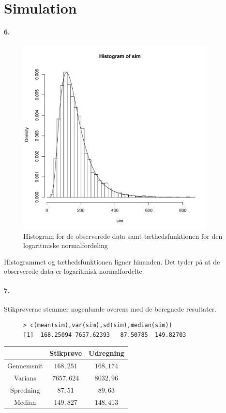 \section{Simulation}
\paragraph{6.}
\begin{figure}[H]
\label{fig:sim1}
\begin{center}
\includegraphics[width=10cm]{graphs/simulation_1.pdf}
\caption{Histogram for de observerede data samt tæthedsfunktionen for
den logaritmiske normalfordeling}
\end{center}
\end{figure}
Histogrammet og tæthedsfunktionen ligner hinanden. Det tyder på at de
observerede data er logaritmisk normalfordelte.
\paragraph{7.}
Stikprøverne stemmer nogenlunde overens med de beregnede resultater.
\begin{figure}[H]
\label{fig:sim2}
\begin{center}
\begin{verbatim}
> c(mean(sim),var(sim),sd(sim),median(sim))
[1]  168.25094 7657.62393   87.50785  149.82703
\end{verbatim}
\caption{}
\end{center}
\end{figure}

\begin{tabular}{c|c|c}
& Stikprøve & Udregning \\
\hline
Gennemsnit & $168,251$ & $168,174$ \\
Varians & $7657,624$ & $8032,96$ \\
Spredning & $87,51$ & $89,63$ \\
Median & $149,827$ & $148,413$ \\
\end{tabular}

